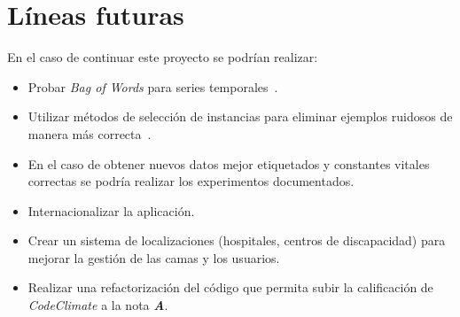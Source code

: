 \section{Líneas futuras}
En el caso de continuar este proyecto se podrían realizar:
\begin{itemize}
	\item Probar \textit{Bag of Words} para series temporales~\cite{johann_faouzi_2018_1244152}.
	\item Utilizar métodos de selección de instancias para eliminar ejemplos ruidosos de manera más correcta~\cite{arnaiz2016instance}.
	\item En el caso de obtener nuevos datos mejor etiquetados y constantes vitales correctas se podría realizar los experimentos documentados.
	\item Internacionalizar la aplicación.
	\item Crear un sistema de localizaciones (hospitales, centros de discapacidad) para mejorar la gestión de las camas y los usuarios.
	\item Realizar una refactorización del código que permita subir la calificación de \textit{CodeClimate} a la nota \textit{\textbf{A}}.
\end{itemize}